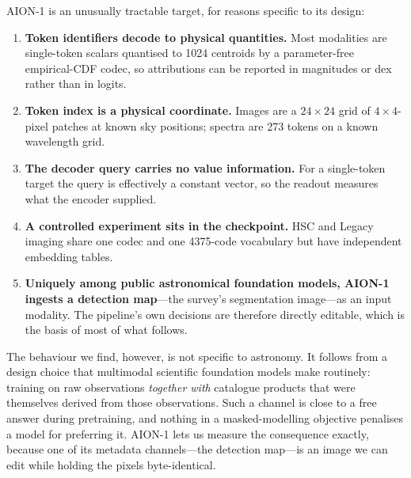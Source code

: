 \documentclass[11pt]{article}
\newcommand{\aion}{AION-1}
\begin{document}
\aion{} is an unusually tractable target, for reasons specific to its design:
\begin{enumerate}\itemsep2pt
\item \textbf{Token identifiers decode to physical quantities.} Most modalities are single-token
scalars quantised to 1024 centroids by a parameter-free empirical-CDF codec, so attributions can
be reported in magnitudes or dex rather than in logits.
\item \textbf{Token index is a physical coordinate.} Images are a $24\times24$ grid of
$4\times4$-pixel patches at known sky positions; spectra are 273 tokens on a known wavelength grid.
\item \textbf{The decoder query carries no value information.} For a single-token target the
query is effectively a constant vector, so the readout measures what the encoder supplied.
\item \textbf{A controlled experiment sits in the checkpoint.} HSC and Legacy imaging share one
codec and one 4375-code vocabulary but have independent embedding tables.
\item \textbf{Uniquely among public astronomical foundation models, \aion{} ingests a detection
map}---the survey's segmentation image---as an input modality. The pipeline's own decisions are
therefore directly editable, which is the basis of most of what follows.
\end{enumerate}

The behaviour we find, however, is not specific to astronomy. It follows from a design choice
that multimodal scientific foundation models make routinely: training on raw observations
\emph{together with} catalogue products that were themselves derived from those observations.
Such a channel is close to a free answer during pretraining, and nothing in a masked-modelling
objective penalises a model for preferring it. \aion{} lets us measure the consequence exactly,
because one of its metadata channels---the detection map---is an image we can edit while holding
the pixels byte-identical.
\end{document}
